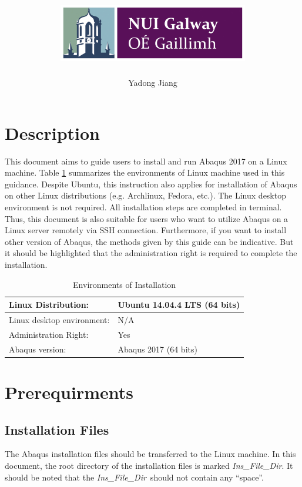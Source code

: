 \documentclass[12pt]{article}
\title{\includegraphics[height=1in]{Figures/NUIG_Logo.jpg} \vspace{100pt} \\ \tit}
\author[1]{Yadong Jiang}
\affil[1]{College of Engineering and Informatics, National University of Ireland Galway}
\date{}
\newcommand{\ifp}{\textit{Ins\_File\_Dir}}
\begin{document}
\maketitle

\newpage

\section*{Description}
This document aims to guide users to install and run Abaqus 2017 on a Linux machine. Table \ref{tb-1} summarizes the environments of Linux machine used in this guidance. Despite Ubuntu, this instruction also applies for installation of Abaqus on other Linux distributions (e.g. Archlinux, Fedora, etc.). The Linux desktop environment is not required. All installation steps are completed in terminal. Thus, this document is also suitable for users who want to utilize Abaqus on a Linux server remotely via SSH connection. Furthermore, if you want to install other version of Abaqus, the methods given by this guide can be indicative. But it should be highlighted that the administration right is required to complete the installation.

\begin{table}[h!]
\caption{Environments of Installation}
\begin{center}
\begin{tabular}{l l}
    \hline
    Linux Distribution: & Ubuntu 14.04.4 LTS (64 bits)\\
    \hline
    Linux desktop environment: & N/A \\
    \hline
    Administration Right: & Yes \\
    \hline
    Abaqus version: & Abaqus 2017 (64 bits) \\
    \hline
\end{tabular}
\end{center}
\label{tb-1}
\end{table}

\section*{Prerequirments}
\subsection*{Installation Files}
The Abaqus installation files should be transferred to the Linux machine. In this document, the root directory of the installation files is marked \ifp. It should be noted that the \ifp\ should not contain any ``space''.
\end{document}
